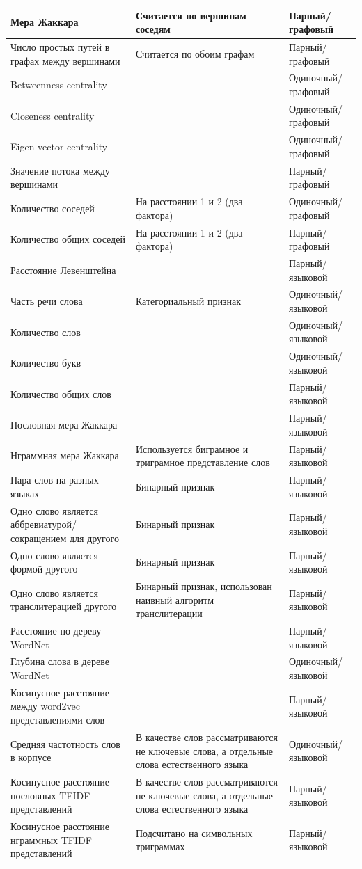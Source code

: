 \begin{longtable}{|p{5cm}|p{4cm}|p{5cm}|}
        Мера Жаккара & Считается по вершинам соседям & Парный/графовый \\ \hline
        Число простых путей в графах между вершинами & Считается по обоим графам & Парный/графовый \\ \hline
        Betweenness centrality  & & Одиночный/графовый \\ \hline
        Closeness centrality & & Одиночный/графовый \\ \hline
        Eigen vector centrality & & Одиночный/графовый \\ \hline
        Значение потока между вершинами & & Парный/графовый \\ \hline
        Количество соседей & На расстоянии 1 и 2 (два фактора) & Одиночный/графовый \\ \hline
        Количество общих соседей & На расстоянии 1 и 2 (два фактора) & Парный/графовый \\ \hline
        Расстояние Левенштейна & & Парный/языковой \\ \hline
        Часть речи слова & Категориальный признак & Одиночный/языковой \\ \hline
        Количество слов  & & Одиночный/языковой \\ \hline
        Количество букв & & Одиночный/языковой \\ \hline
        Количество общих слов & & Парный/языковой \\ \hline
        Пословная мера Жаккара & & Парный/языковой \\ \hline
        Нграммная мера Жаккара & Используется биграмное и триграмное представление слов & Парный/языковой \\ \hline
        Пара слов на разных языках & Бинарный признак & Парный/языковой \\ \hline
        Одно слово является аббревиатурой/сокращением  для другого & Бинарный признак & Парный/языковой \\ \hline
        Одно слово является формой другого & Бинарный признак & Парный/языковой \\ \hline
        Одно слово является транслитерацией другого & Бинарный признак, использован наивный алгоритм транслитерации & Парный/языковой \\ \hline
        Расстояние по дереву WordNet & & Парный/языковой \\ \hline
        Глубина слова в дереве WordNet & & Одиночный/языковой \\ \hline
        Косинусное расстояние между word2vec представлениями слов & & Парный/языковой \\ \hline
        Средняя частотность слов в корпусе & В качестве слов рассматриваются не ключевые слова, а отдельные слова естественного языка  & Одиночный/языковой \\ \hline
        Косинусное расстояние пословных TFIDF представлений & В качестве слов рассматриваются не ключевые слова, а отдельные слова естественного языка & Парный/языковой \\ \hline
        Косинусное расстояние нграммных TFIDF представлений & Подсчитано на символьных триграммах & Парный/языковой \\ \hline


\end{longtable}

